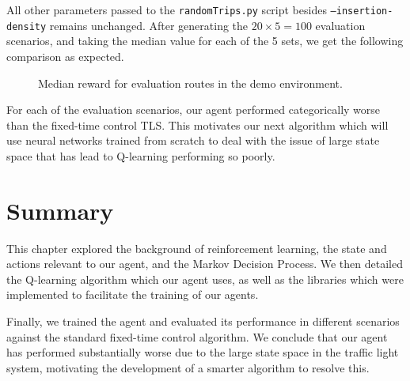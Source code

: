 \documentclass[a4paper]{report}
\begin{document}
All other parameters passed to the \texttt{randomTrips.py} script besides \texttt{--insertion-density} remains unchanged. After generating the $20\times5=100$ evaluation scenarios, and taking the median value for each of the 5 sets, we get the following comparison as expected.

\begin{figure}[H]
  \centering
  \caption{Median reward for evaluation routes in the demo environment.}
  \label{fig:q_learning_demo_eval}
\end{figure}

For each of the evaluation scenarios, our agent performed categorically worse than the fixed-time control TLS. This motivates our next algorithm which will use neural networks trained from scratch to deal with the issue of large state space that has lead to Q-learning performing so poorly.

\section{Summary}

This chapter explored the background of reinforcement learning, the state and actions relevant to our agent, and the Markov Decision Process. We then detailed the Q-learning algorithm which our agent uses, as well as the libraries which were implemented to facilitate the training of our agents.

Finally, we trained the agent and evaluated its performance in different scenarios against the standard fixed-time control algorithm. We conclude that our agent has performed substantially worse due to the large state space in the traffic light system, motivating the development of a smarter algorithm to resolve this. 
\end{document}
